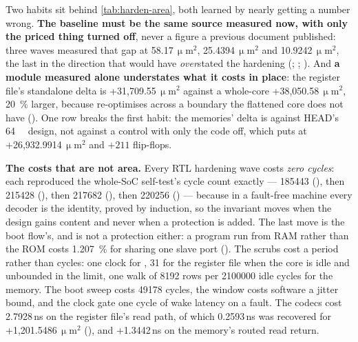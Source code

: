 Two habits sit behind \cref{tab:harden-area}, both learned by nearly
getting a number wrong. \textbf{The baseline must be the same source
measured now, with only the priced thing turned off}, never a figure a
previous document published: three waves measured that gap at
58.17\,$\upmu$m$^2$, 25.4394\,$\upmu$m$^2$
and 10.9242\,$\upmu$m$^2$, the last in the direction that
would have \emph{over}stated the hardening (;
; ). And \textbf{a module
measured alone understates what it costs in place}: the register file's
standalone delta is +31{,}709.55\,$\upmu$m$^2$ against a
whole-core +38{,}050.58\,$\upmu$m$^2$, \SI{20}{\percent}
larger, because  re-optimises across a boundary the flattened
core does not have (). One row breaks the first
habit: the memories' delta is against HEAD's \SI{64}{\kibi\byte} design,
not against a control with only the code off, which
 puts at +26{,}932.9914\,$\upmu$m$^2$ and $+211$
flip-flops.

\textbf{The costs that are not area.} Every RTL hardening wave costs
\emph{zero cycles}: each reproduced the whole-SoC self-test's cycle
count exactly --- \num{185443} (), then
\num{215428} (), then \num{217682}
(), then \num{220256} ()
--- because in a fault-free machine
every decoder is the identity, proved by induction, so the invariant
moves when the design gains content and never when a protection is
added. The last move is the boot flow's, and is not a protection either:
a program run from RAM rather than the ROM costs \SI{+1.207}{\percent}
for sharing one slave port (). The scrubs cost a period rather than cycles: one
clock for , 31 for the register file when the core is idle
and unbounded in the limit, one walk of \num{8192} rows per
\num{2100000} idle cycles for the memory. The boot sweep costs
\num{49178} cycles, the window costs software a jitter bound, and the
clock gate one cycle of wake latency on a fault. The codecs cost
2.7928\,ns on the register file's read path, of which
0.2593\,ns was recovered for
+1{,}201.5486\,$\upmu$m$^2$ (), and
+1.3442\,ns on the memory's routed read return.


